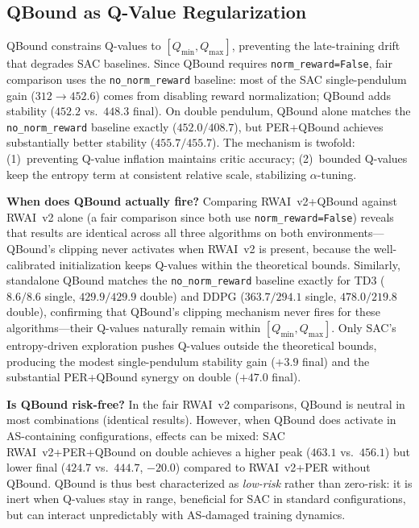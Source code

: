 \documentclass[11pt,a4paper]{article}
\begin{document}
\subsection{QBound as Q-Value Regularization}

QBound constrains Q-values to $[Q_{\min}, Q_{\max}]$, preventing the late-training drift that degrades SAC baselines. Since QBound requires \texttt{norm\_reward=False}, fair comparison uses the \texttt{no\_norm\_reward} baseline: most of the SAC single-pendulum gain ($312 \to 452.6$) comes from disabling reward normalization; QBound adds stability ($452.2$ vs.\ $448.3$ final). On double pendulum, QBound alone matches the \texttt{no\_norm\_reward} baseline exactly ($452.0/408.7$), but PER+QBound achieves substantially better stability ($455.7/455.7$). The mechanism is twofold: (1)~preventing Q-value inflation maintains critic accuracy; (2)~bounded Q-values keep the entropy term at consistent relative scale, stabilizing $\alpha$-tuning.

\textbf{When does QBound actually fire?} Comparing RWAI~v2+QBound against RWAI~v2 alone (a fair comparison since both use \texttt{norm\_reward=False}) reveals that results are identical across all three algorithms on both environments---QBound's clipping never activates when RWAI~v2 is present, because the well-calibrated initialization keeps Q-values within the theoretical bounds. Similarly, standalone QBound matches the \texttt{no\_norm\_reward} baseline exactly for TD3 ($8.6/8.6$ single, $429.9/429.9$ double) and DDPG ($363.7/294.1$ single, $478.0/219.8$ double), confirming that QBound's clipping mechanism never fires for these algorithms---their Q-values naturally remain within $[Q_{\min}, Q_{\max}]$. Only SAC's entropy-driven exploration pushes Q-values outside the theoretical bounds, producing the modest single-pendulum stability gain ($+3.9$ final) and the substantial PER+QBound synergy on double ($+47.0$ final).

\textbf{Is QBound risk-free?} In the fair RWAI~v2 comparisons, QBound is neutral in most combinations (identical results). However, when QBound does activate in AS-containing configurations, effects can be mixed: SAC RWAI~v2+PER+QBound on double achieves a higher peak ($463.1$ vs.\ $456.1$) but lower final ($424.7$ vs.\ $444.7$, $-20.0$) compared to RWAI~v2+PER without QBound. QBound is thus best characterized as \emph{low-risk} rather than zero-risk: it is inert when Q-values stay in range, beneficial for SAC in standard configurations, but can interact unpredictably with AS-damaged training dynamics.
\end{document}
